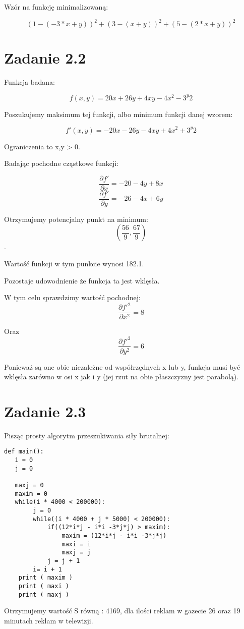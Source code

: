 \documentclass[paper=a4, fontsize=11pt]{scrartcl} %
\begin{document}
Wzór na funkcję minimalizowaną:

\[(1-(-3*x+y))^2+(3-(x+y))^2+(5-(2*x+y))^2\]

\newpage
\section{Zadanie 2.2}

Funkcja badana:

\[f(x,y)=20x+26y+4xy-4x^2-3^y2\]

Poszukujemy maksimum tej funkcji, albo minimum funkcji danej wzorem:

\[f'(x,y)=-20x-26y-4xy+4x^2+3^y2\]

Ograniczenia to x,y > 0.

Badając pochodne cząstkowe funkcji:

\[\frac{\partial f'}{\partial x}=-20-4y+8x\]
\[\frac{\partial f'}{\partial y}=-26-4x+6y\]

Otrzymujemy potencjalny punkt na minimum: \[(\frac{56}{9},\frac{67}{9})\].

Wartość funkcji w tym punkcie wynosi 182.1.

Pozostaje udowodnienie że funkcja ta jest wklęsła.

W tym celu sprawdzimy wartość pochodnej:
\[\frac{\partial f'^2}{\partial x^2}=8\]

Oraz
\[\frac{\partial f'^2}{\partial y^2}=6\]

Ponieważ są one obie niezależne od współrzędnych x lub y, funkcja musi być wklęsła zarówno w osi x jak i y (jej rzut na obie płaszczyzny jest parabolą). 

\newpage
\section{Zadanie 2.3}

Pisząc prosty algorytm przeszukiwania siły brutalnej:

\begin{lstlisting}
def main():
   i = 0
   j = 0

   maxj = 0
   maxim = 0
   while(i * 4000 < 200000):
        j = 0
        while((i * 4000 + j * 5000) < 200000):
            if((12*i*j - i*i -3*j*j) > maxim):
                maxim = (12*i*j - i*i -3*j*j)
                maxi = i
                maxj = j
            j = j + 1
        i= i + 1
    print ( maxim )
    print ( maxi )
    print ( maxj )
\end{lstlisting}

Otrzymujemy wartość S równą : 4169, dla ilości reklam w gazecie 26 oraz 19 minutach reklam w telewizji.
\newpage
\end{document}
